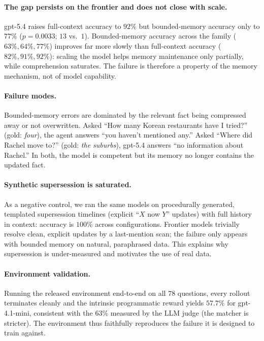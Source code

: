 \documentclass[]{ceurart}
\begin{document}
\paragraph{The gap persists on the frontier and does not close with scale.}
gpt-5.4 raises full-context accuracy to $92\%$ but bounded-memory accuracy only
to $77\%$ ($p=0.0033$; $13$ vs.\ $1$). Bounded-memory accuracy across the
family ($63\%, 64\%, 77\%$) improves far more slowly than full-context
accuracy ($82\%, 91\%, 92\%$): scaling the model helps memory maintenance only
partially, while comprehension saturates. The failure is therefore a property
of the memory mechanism, not of model capability.

\paragraph{Failure modes.} Bounded-memory errors are dominated by the relevant
fact being compressed away or not overwritten. Asked ``How many Korean
restaurants have I tried?'' (gold: \emph{four}), the agent answers ``you
haven't mentioned any.'' Asked ``Where did Rachel move to?'' (gold:
\emph{the suburbs}), gpt-5.4 answers ``no information about Rachel.'' In both,
the model is competent but its memory no longer contains the updated fact.

\paragraph{Synthetic supersession is saturated.} As a negative control, we ran
the same models on procedurally generated, templated supersession timelines
(explicit ``$X$ now $Y$'' updates) with full history in context: accuracy is
$100\%$ across configurations. Frontier models trivially resolve clean,
explicit updates by a last-mention scan; the failure only appears with bounded
memory on natural, paraphrased data. This explains why supersession is
under-measured and motivates the use of real data.

\paragraph{Environment validation.} Running the released environment
end-to-end on all $78$ questions, every rollout terminates cleanly and the
intrinsic programmatic reward yields $57.7\%$ for gpt-4.1-mini, consistent with
the $63\%$ measured by the LLM judge (the matcher is stricter). The
environment thus faithfully reproduces the failure it is designed to train
against.
\end{document}
